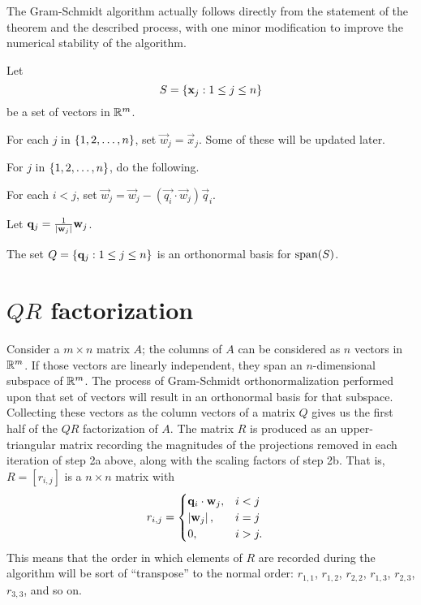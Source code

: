 \documentclass[m3380-lec-main.tex]{subfiles}
\begin{document}
The Gram-Schmidt algorithm actually follows directly from the statement of the theorem and the described process, with one minor modification to improve the numerical stability of the algorithm.

\begin{alg} Let \[S=\left\{\mathbf{x}_j:1\leq j\leq n\right\}\] be a set of vectors in $\mathbb{R}^m$. 
\begin{enum}
\item For each $j$ in $\left\{1,2,\ldots,n\right\}$, set $\vec{w}_j = \vec{x}_j$. Some of these will be updated later.
\item For $j$ in $\left\{1,2,\ldots,n\right\}$, do the following.
\begin{enuma}
\item For each $i<j$, set $\vec{w}_j = \vec{w}_j - (\vec{q_i}\cdot \vec{w}_j)\vec{q}_i$.
\item Let $\mathbf{q}_j = \frac1{\left|\mathbf{w}_j\right|}\mathbf{w}_j$.
\end{enuma}
\end{enum}
The set $Q=\left\{\mathbf{q}_j:1\leq j\leq n\right\}$ is an orthonormal basis for $\operatorname{span}(S)$.
\end{alg}

\section{$QR$ factorization}
Consider a $m\times n$ matrix $A$; the columns of $A$ can be considered as $n$ vectors in $\mathbb{R}^m$. If those vectors are linearly independent, they span an $n$-dimensional subspace of $\mathbb{R}^m$. The process of Gram-Schmidt orthonormalization performed upon that set of vectors will result in an orthonormal basis for that subspace. Collecting these vectors as the column vectors of a matrix $Q$ gives us the first half of the $QR$ factorization of $A$. The matrix $R$ is produced as an upper-triangular matrix recording the magnitudes of the projections removed in each iteration of step 2a above, along with the scaling factors of step 2b. That is, $R=[r_{i,j}]$ is a $n\times n$ matrix with
\begin{align}\label{eq:rmatrix}
r_{i,j} &= \begin{cases}
	\mathbf{q}_i\cdot \mathbf{w}_j, & i<j \\
	\left|\mathbf{w}_j\right|, & i=j \\
	0, &i>j.
	\end{cases}
\end{align}
This means that the order in which elements of $R$ are recorded during the algorithm will be sort of ``transpose'' to the normal order: $r_{1,1}$, $r_{1,2}$, $r_{2,2}$, $r_{1,3}$, $r_{2,3}$, $r_{3,3}$, and so on. 
\end{document}
